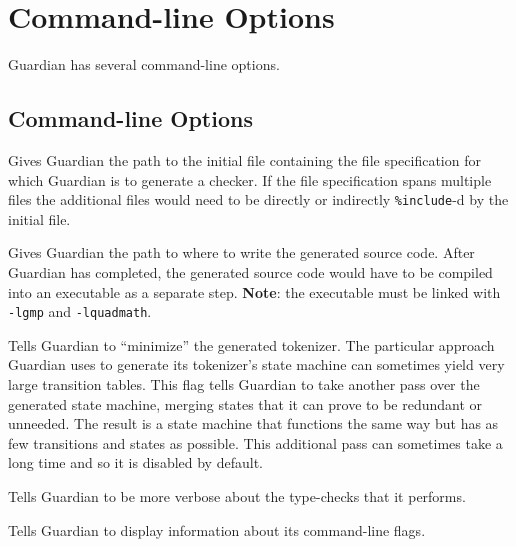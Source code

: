 
\chapter{Command-line Options}
{
	Guardian has several command-line options.
	
	\section{Command-line Options}
	{
		\begin{itemize}
		{
			\item [\texttt{-i <path>}]
			{
				Gives Guardian the path to the initial file containing the
				file specification for which Guardian is to generate a checker.
				If the file specification spans multiple
				files the additional files would need to be
				directly or indirectly \texttt{\%include}-d by the initial file.
			}
			
			\item [\texttt{-o <path>}]
			{
				Gives Guardian the path to where to write the generated source
				code. After Guardian has completed, the generated source code
				would have to be compiled into an executable as a separate step.
				\textbf{Note}: the executable must be
				linked with \texttt{-lgmp} and
				\texttt{-lquadmath}.
			}
			
			\item [\texttt{-m}]
			{
				Tells Guardian to ``minimize'' the generated tokenizer. The
				particular approach Guardian uses to generate its tokenizer's
				state machine can sometimes yield very large transition tables.
				This flag tells Guardian to take another pass over the generated
				state machine, merging states that it can prove to be redundant
				or unneeded. The result is a state machine that functions the
				same way but has as few transitions and states as
				possible.
				This additional pass can sometimes take a long
				time and so it is
				disabled by default.
			}
			
			\item [\texttt{-v}]
			{
				Tells Guardian to be more verbose about the type-checks that
				it performs.
			}
			
			\item [\texttt{-h}]
			{
				Tells Guardian to display information about its command-line
				flags.
			}
		}
		\end{itemize}
	}
}





